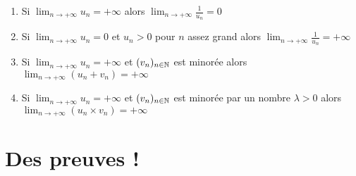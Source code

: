 \begin{frame}
\begin{proposition}
\label{prop:suiteinfty}
\small
  \begin{enumerate}
    \setlength{\itemsep}{9pt} 
    \item Si $\displaystyle \lim_{n\to +\infty}u_n=+\infty$ alors $\displaystyle \lim_{n\to +\infty}\frac{1}{u_n}=0$
    \pause
    \item Si $\displaystyle \lim_{n\to +\infty}u_n= 0$ et $u_n>0$ pour $n$ assez grand 
    alors $\displaystyle \lim_{n\to +\infty}\frac{1}{u_n}=+\infty$
    \pause    
    
    \item Si $\displaystyle \lim_{n\to +\infty}u_n=+\infty$ et $(v_n)_{n\in \mathbb{N}}$ est minorée alors 
    $\displaystyle \lim_{n\to +\infty}\left(u_n+v_n\right)=+\infty$
    \pause    
    \item Si  $\displaystyle \lim_{n\to +\infty}u_n=+\infty$ et $(v_n)_{n\in \mathbb{N}}$ est minorée par un nombre $\lambda>0$ 
alors \\ \hfil  \hfil $\displaystyle \lim_{n\to +\infty}\left(u_n\times v_n\right)=+\infty$
    
  \end{enumerate}
\end{proposition}

\end{frame}

\section{Des preuves !}

